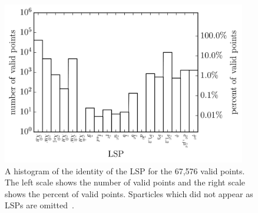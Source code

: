 \begin{figure}
    \centering
    \includegraphics[width=0.95\textwidth]{figs/rpvthreel/LSPprobability.png}
    \caption[histogram of the LSPs for the valid points of the statistical analysis]{A histogram of the identity of the LSP for the 67,576 valid points.
    The left scale shows the number of valid points and the right scale shows the percent of valid points.
    Sparticles which did not appear as LSPs are omitted~\cite{Dumitru:2018nct}.}
    \label{fig:LSPprob}
\end{figure}
